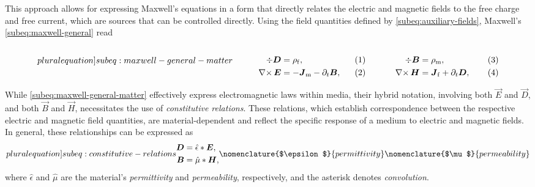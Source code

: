 \documentclass[11pt,a4paper,twoside,openany]{report}
\begin{document}
This approach allows for expressing Maxwell's equations in a form that directly relates the electric and magnetic fields to the free charge and free current, which are sources that can be controlled directly. Using the field quantities defined by \cref{subeq:auxiliary-fields}, Maxwell's \cref{subeq:maxwell-general} read\\
\begin{subequations}
    \label[pluralequation]{subeq:maxwell-general-matter}
    \noindent\centering
    \begin{minipage}{0.45\textwidth}
        \begin{align}
            \label{eq:maxwell-general-matter-div-d}
            \div\vec D &= \rho_{\mathrm f},
        \\
            \label{eq:maxwell-general-matter-curl-e}
            \curl\vec E &= -\vec J_{\mathrm m} - \partial_t\vec B,
        \end{align}
    \end{minipage}
    \hfill
    \begin{minipage}{0.45\textwidth}
        \begin{align}
            \label{eq:maxwell-general-matter-div-b}
            \div\vec B &= \rho_{\mathrm{m}},
        \\
            \label{eq:maxwell-general-matter-curl-h}
            \curl\vec H &= \vec J_{\mathrm f} + \partial_t\vec D,
        \end{align}
    \end{minipage}
    \bigskip
\end{subequations}

While \cref{subeq:maxwell-general-matter} effectively express electromagnetic laws within media, their hybrid notation, involving both $\vec E$ and $\vec D$, and both $\vec B$ and $\vec H$, necessitates the use of \emph{constitutive relations}. These relations, which establish correspondence between the respective electric and magnetic field quantities, are material-dependent and reflect the specific response of a medium to electric and magnetic fields. In general, these relationships can be expressed as
\begin{subequations}
    \label[pluralequation]{subeq:constitutive-relations}
    \begin{align}
        \label{eq:constitutive-relation-permittivity}
        \vec D &= \hat\epsilon \ast \vec E,
    \\
        \label{eq:constitutive-relation-permeability}
        \vec B &= \hat\mu \ast \vec H,
    \end{align}
    \nomenclature{$\epsilon$}{permittivity }%
    \nomenclature{$\mu$}{permeability }%
    \index{constitutive relations}
    \index{constitutive parameters}
\end{subequations}
where $\hat\epsilon$ and $\hat\mu$ are the material's \emph{permittivity} and \emph{permeability}, respectively, and the asterisk denotes \emph{convolution}.
\end{document}
